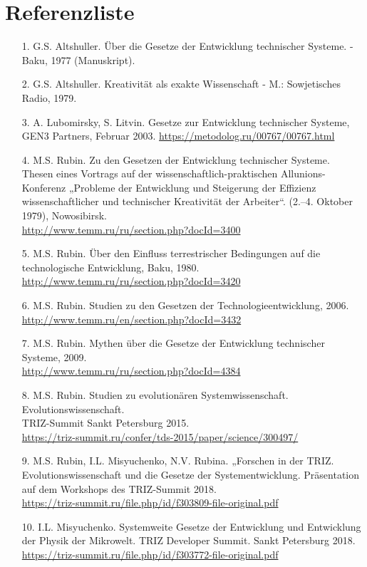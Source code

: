 \documentclass[11pt,a4paper]{article}
\begin{document}
\section*{Referenzliste}
\begin{itemize}
\item[1.] G.S. Altshuller. Über die Gesetze der Entwicklung technischer
  Systeme. - Baku, 1977 (Manuskript).
\item[2.] G.S. Altshuller. Kreativität als exakte Wissenschaft - M.:
  Sowjetisches Radio, 1979.
\item[3.] A. Lubomirsky, S. Litvin. Gesetze zur Entwicklung technischer
  Systeme, GEN3 Partners, Februar 2003.
  \url{https://metodolog.ru/00767/00767.html}
\item[4.] M.S. Rubin. Zu den Gesetzen der Entwicklung technischer Systeme.
  Thesen eines Vortrags auf der wissenschaftlich-praktischen
  Allunions-Konferenz „Probleme der Entwicklung und Steigerung der Effizienz
  wissenschaftlicher und technischer Kreativität der
  Arbeiter“. (2.--4. Oktober 1979), Nowosibirsk.\\
  \url{http://www.temm.ru/ru/section.php?docId=3400}
\item[5.] M.S. Rubin. Über den Einfluss terrestrischer Bedingungen auf die
  technologische Entwicklung, Baku, 1980.
  \url{http://www.temm.ru/ru/section.php?docId=3420}
\item[6.] M.S. Rubin. Studien zu den Gesetzen der Technologieentwicklung,
  2006.\\  \url{http://www.temm.ru/en/section.php?docId=3432}
\item[7.] M.S. Rubin. Mythen über die Gesetze der Entwicklung technischer
  Systeme, 2009.\\  \url{http://www.temm.ru/ru/section.php?docId=4384}
\item[8.] M.S. Rubin. Studien zu evolutionären Systemwissenschaft.
  Evolutionswissenschaft.\\ TRIZ-Summit Sankt Petersburg 2015.\\
  \url{https://triz-summit.ru/confer/tds-2015/paper/science/300497/}
\item[9.] M.S. Rubin, I.L. Misyuchenko, N.V. Rubina. „Forschen in der TRIZ.
  Evolutionswissenschaft und die Gesetze der Systementwicklung.  Präsentation
  auf dem Workshops des TRIZ-Summit 2018.\\
  \url{https://triz-summit.ru/file.php/id/f303809-file-original.pdf}
\item[10.] I.L. Misyuchenko. Systemweite Gesetze der Entwicklung und
  Entwicklung der Physik der Mikrowelt.  TRIZ Developer Summit.  Sankt
  Petersburg 2018.\\
  \url{https://triz-summit.ru/file.php/id/f303772-file-original.pdf}
\end{itemize}
\end{document}
